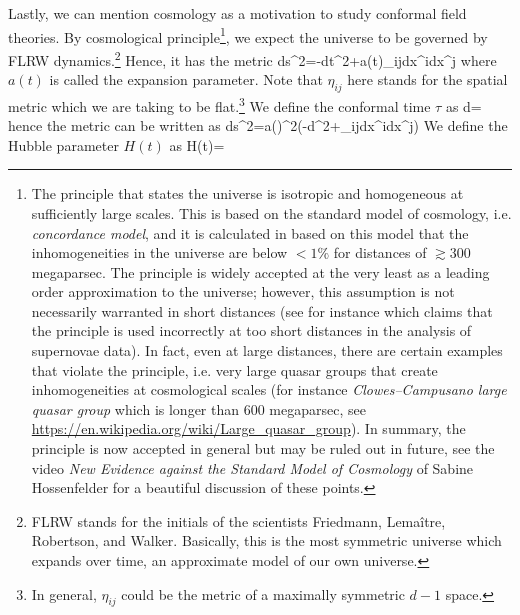 Lastly, we can mention cosmology as a motivation to study conformal field theories. By cosmological principle\footnote{The principle that states the universe is isotropic and homogeneous at sufficiently large scales. This is based on the standard model of cosmology, i.e. \emph{concordance model}, and it is calculated in \cite{Hunt:2008wp} based on this model that the inhomogeneities in the universe are below $<1\%$ for distances of $\gtrsim300$ megaparsec. The principle is widely accepted at the very least as a leading order approximation to the universe; however, this assumption is not necessarily warranted in short distances (see for instance \cite{Colin:2019opb} which claims that the principle is used incorrectly at too short distances in the analysis of supernovae data). In fact, even at large distances, there are certain examples that violate the principle, i.e. very large quasar groups that create inhomogeneities at cosmological scales (for instance \emph{Clowes–Campusano large quasar group} which is longer than $600$ megaparsec, see \hyperref{https://en.wikipedia.org/wiki/Large\_quasar\_group}{}{}{https://en.wikipedia.org/wiki/Large\_quasar\_group}). In summary, the principle is now accepted in general but may be ruled out in future, see the video \emph{New Evidence against the Standard Model of Cosmology} of Sabine Hossenfelder for a beautiful discussion of these points.
}, we expect the universe to be governed by FLRW dynamics.\footnote{FLRW stands for the initials of the scientists Friedmann, Lemaître, Robertson, and Walker. Basically, this is the most symmetric universe which expands over time, an approximate model of our own universe.} Hence, it has the metric
\be 
ds^2=-dt^2+a(t)\eta_{ij}dx^idx^j
\ee 
where $a(t)$ is called the expansion parameter. Note that $\eta_{ij}$ here stands for the spatial metric which we are taking to be flat.\footnote{In general, $\eta_{ij}$ could be the metric of a maximally symmetric $d-1$ space.} We define the conformal time $\tau$ as
\be 
d\tau=
\ee 
hence the metric can be written as 
\be 
\label{eq: FRW metric in conformal time}
ds^2=a(\tau)^2\left(-d\tau^2+\eta_{ij}dx^idx^j\right)
\ee
We define the Hubble parameter $H(t)$ as 
\be 
H(t)=
\ee  

